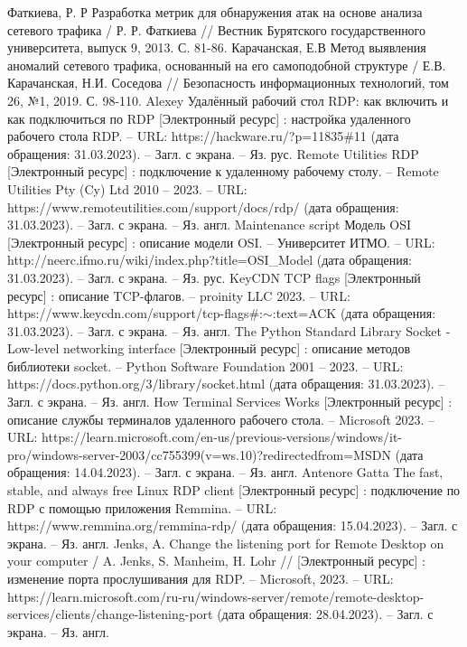 \documentclass[bachelor, och, coursework]{SCWorks}
\begin{document}
  \begin{thebibliography}{15}
    Фаткиева, Р. Р Разработка метрик для обнаружения атак на основе анализа сетевого трафика / Р. Р. Фаткиева // Вестник Бурятского государственного университета, выпуск 9, 2013. С. 81-86.
    Карачанская, Е.В Метод выявления аномалий сетевого трафика, основанный на его самоподобной структуре / Е.В. Карачанская, Н.И. Соседова // Безопасность информационных технологий, том 26, №1, 2019. С. 98-110.
    Alexey Удалённый рабочий стол RDP: как включить и как подключиться по RDP [Электронный ресурс] : настройка удаленного рабочего стола RDP. -- URL: https://hackware.ru/?p=11835\#11 (дата обращения: 31.03.2023). -- Загл. с экрана. -- Яз. рус.
    Remote Utilities RDP [Электронный ресурс] : подключение к удаленному рабочему столу. --  Remote Utilities Pty (Cy) Ltd 2010 -- 2023. -- URL:  https://www.remoteutilities.com/support/docs/rdp/ (дата обращения: 31.03.2023). -- Загл. с экрана. -- Яз. англ.
    Maintenance script Модель OSI [Электронный ресурс] : описание модели OSI. -- Университет ИТМО. -- URL: http://neerc.ifmo.ru/wiki/index.php?title=OSI_Model (дата обращения: 31.03.2023). -- Загл. с экрана. --  Яз. рус.
    KeyCDN TCP flags [Электронный ресурс] : описание TCP-флагов. -- proinity LLC 2023. -- URL: https://www.keycdn.com/support/tcp-flags\#:$\sim$:text=ACK (дата обращения: 31.03.2023). -- Загл. с экрана. --  Яз. англ.
    The Python Standard Library Socket - Low-level networking interface [Электронный ресурс] : описание методов библиотеки socket. -- Python Software Foundation 2001 -- 2023. -- URL: https://docs.python.org/3/library/socket.html (дата обращения: 31.03.2023). -- Загл. с экрана. -- Яз. англ.
    How Terminal Services Works [Электронный ресурс] : описание службы терминалов удаленного рабочего стола. -- Microsoft 2023. -- URL:  https://learn.microsoft.com/en-us/previous-versions/windows/it-pro/windows-server-2003/cc755399(v=ws.10)?redirectedfrom=MSDN (дата обращения: 14.04.2023). -- Загл. с экрана. -- Яз. англ.
    Antenore Gatta The fast, stable, and always free Linux RDP client [Электронный ресурс] : подключение по RDP с помощью приложения Remmina. -- URL: https://www.remmina.org/remmina-rdp/ (дата обращения: 15.04.2023). -- Загл. с экрана. -- Яз.  англ.
    Jenks, A. Change the listening port for Remote Desktop on your computer / A. Jenks, S. Manheim, H. Lohr // [Электронный ресурс] : изменение порта прослушивания для RDP. -- Microsoft, 2023. -- URL: https://learn.microsoft.com/ru-ru/windows-server/remote/remote-desktop-services/clients/change-listening-port (дата обращения: 28.04.2023). -- Загл. с экрана. -- Яз. англ.

\end{thebibliography}
\end{document}
